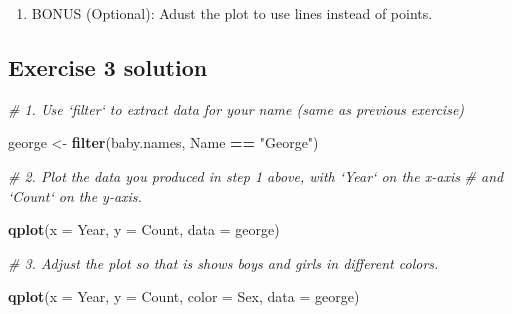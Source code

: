 \documentclass[]{book}
\newenvironment{Shaded}{\begin{snugshade}}{\end{snugshade}}
\newcommand{\KeywordTok}[1]{\textcolor[rgb]{0.13,0.29,0.53}{\textbf{#1}}}
\newcommand{\DataTypeTok}[1]{\textcolor[rgb]{0.13,0.29,0.53}{#1}}
\newcommand{\StringTok}[1]{\textcolor[rgb]{0.31,0.60,0.02}{#1}}
\newcommand{\CommentTok}[1]{\textcolor[rgb]{0.56,0.35,0.01}{\textit{#1}}}
\newcommand{\OperatorTok}[1]{\textcolor[rgb]{0.81,0.36,0.00}{\textbf{#1}}}
\newcommand{\NormalTok}[1]{#1}
\providecommand{\tightlist}{%
  \setlength{\itemsep}{0pt}\setlength{\parskip}{0pt}}
\begin{document}
\begin{enumerate}
\def\labelenumi{\arabic{enumi}.}
\setcounter{enumi}{3}
\tightlist
\item
  BONUS (Optional): Adust the plot to use lines instead of points.
\end{enumerate}

\subsection{Exercise 3 solution}\label{exercise-3-solution}

\begin{Shaded}
\begin{Highlighting}[]
\CommentTok{# 1. Use `filter` to extract data for your name (same as previous exercise)  }
\end{Highlighting}
\end{Shaded}

\begin{Shaded}
\begin{Highlighting}[]
\NormalTok{george <-}\StringTok{ }\KeywordTok{filter}\NormalTok{(baby.names, Name }\OperatorTok{==}\StringTok{ "George"}\NormalTok{)}
\end{Highlighting}
\end{Shaded}

\begin{Shaded}
\begin{Highlighting}[]
\CommentTok{# 2.  Plot the data you produced in step 1 above, with `Year` on the x-axis}
\CommentTok{#     and `Count` on the y-axis.}
\end{Highlighting}
\end{Shaded}

\begin{Shaded}
\begin{Highlighting}[]
\KeywordTok{qplot}\NormalTok{(}\DataTypeTok{x =}\NormalTok{ Year, }\DataTypeTok{y =}\NormalTok{ Count, }\DataTypeTok{data =}\NormalTok{ george)}
\end{Highlighting}
\end{Shaded}

\begin{Shaded}
\begin{Highlighting}[]
\CommentTok{# 3. Adjust the plot so that is shows boys and girls in different colors.}
\end{Highlighting}
\end{Shaded}

\begin{Shaded}
\begin{Highlighting}[]
\KeywordTok{qplot}\NormalTok{(}\DataTypeTok{x =}\NormalTok{ Year, }\DataTypeTok{y =}\NormalTok{ Count, }\DataTypeTok{color =}\NormalTok{ Sex, }\DataTypeTok{data =}\NormalTok{ george)}
\end{Highlighting}
\end{Shaded}
\end{document}
